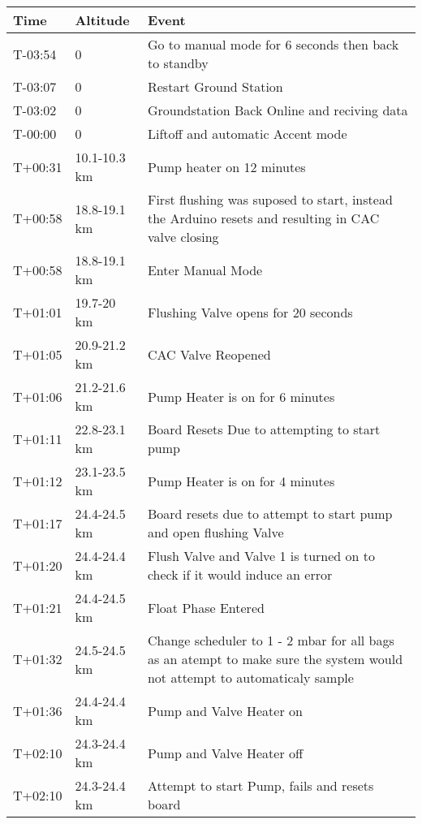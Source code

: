 

\begin{longtable}{|m{}|m{}|m{}|} 
    \hline
        \textbf{Time} & \textbf{Altitude} & \textbf{Event}\\ \hline
        T-03:54 & 0 & Go to manual mode for 6 seconds then back to standby\\ \hline
        T-03:07 & 0 & Restart Ground Station\\ \hline
        T-03:02 & 0 & Groundstation Back Online and reciving data\\ \hline
        T-00:00 & 0 & Liftoff and automatic Accent mode \\ \hline
        T+00:31 & 10.1-10.3 km & Pump heater on 12 minutes\\ \hline
        T+00:58 & 18.8-19.1 km & First flushing was suposed to start, instead the Arduino resets and resulting in CAC valve closing \\ \hline
        T+00:58 & 18.8-19.1 km & Enter Manual Mode\\ \hline
        T+01:01 & 19.7-20 km & Flushing Valve opens for 20 seconds\\ \hline
        T+01:05 & 20.9-21.2 km & CAC Valve Reopened\\ \hline
        T+01:06 & 21.2-21.6 km & Pump Heater is on for 6 minutes \\ \hline
        T+01:11 & 22.8-23.1 km & Board Resets Due to attempting to start pump\\ \hline
        T+01:12 & 23.1-23.5 km & Pump Heater is on for 4 minutes \\ \hline
        T+01:17 & 24.4-24.5 km & Board resets due to attempt to start pump and open flushing Valve\\ \hline
        T+01:20 & 24.4-24.4 km & Flush Valve and Valve 1 is turned on to check if it would induce an error \\ \hline
        T+01:21 & 24.4-24.5 km & Float Phase Entered\\ \hline
        T+01:32 & 24.5-24.5 km & Change scheduler to 1 - 2 mbar for all bags as an atempt to make sure the system would not attempt to automaticaly sample \\ \hline
        T+01:36 & 24.4-24.4 km & Pump and Valve Heater on \\ \hline
        T+02:10 & 24.3-24.4 km & Pump and Valve Heater off\\ \hline
        T+02:10 & 24.3-24.4 km & Attempt to start Pump, fails and resets board\\ \hline

\end{longtable}
